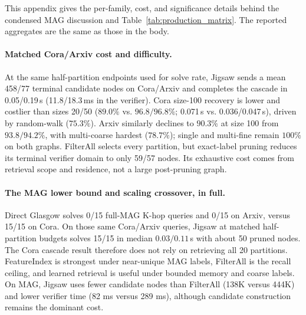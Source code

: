 \documentclass{article}
\begin{document}
This appendix gives the per-family, cost, and significance details behind the condensed MAG discussion and Table~\ref{tab:production_matrix}. The reported aggregates are the same as those in the body.

\paragraph{Matched Cora/Arxiv cost and difficulty.} At the same half-partition endpoints used for solve rate, Jigsaw sends a mean 458/77 terminal candidate nodes on Cora/Arxiv and completes the cascade in 0.05/0.19\,s (11.8/18.3\,ms in the verifier). Cora size-100 recovery is lower and costlier than sizes 20/50 ($89.0\%$ vs. $96.8/96.8\%$; 0.071\,s vs. 0.036/0.047\,s), driven by random-walk ($75.3\%$). Arxiv similarly declines to $90.3\%$ at size 100 from $93.8/94.2\%$, with multi-coarse hardest ($78.7\%$); single and multi-fine remain $100\%$ on both graphs. FilterAll selects every partition, but exact-label pruning reduces its terminal verifier domain to only 59/57 nodes. Its exhaustive cost comes from retrieval scope and residence, not a large post-pruning graph.

\paragraph{The MAG lower bound and scaling crossover, in full.} Direct Glasgow solves 0/15 full-MAG K-hop queries and 0/15 on Arxiv, versus 15/15 on Cora. On those same Cora/Arxiv queries, Jigsaw at matched half-partition budgets solves 15/15 in median $0.03/0.11$\,s with about 50 pruned nodes. The Cora cascade result therefore does not rely on retrieving all 20 partitions. FeatureIndex is strongest under near-unique MAG labels, FilterAll is the recall ceiling, and learned retrieval is useful under bounded memory and coarse labels. On MAG, Jigsaw uses fewer candidate nodes than FilterAll (138K versus 444K) and lower verifier time (82 ms versus 289 ms), although candidate construction remains the dominant cost.
\end{document}
